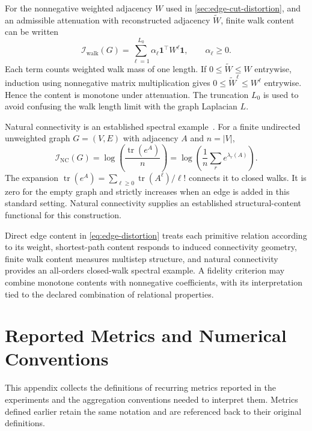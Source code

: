For the nonnegative weighted adjacency $W$ used in \cref{sec:edge-cut-distortion}, and an admissible attenuation with reconstructed adjacency $\widetilde W$, finite walk content can be written
\begin{equation}
\mathcal I_{\mathrm{walk}}(G)
=\sum_{\ell=1}^{L_0}\alpha_\ell\mathbf1^\top W^\ell\mathbf1,
\qquad\alpha_\ell\ge0.
\end{equation}
Each term counts weighted walk mass of one length.
If $0\le\widetilde W\le W$ entrywise, induction using nonnegative matrix multiplication gives $0\le\widetilde W^\ell\le W^\ell$ entrywise.
Hence the content is monotone under attenuation.
The truncation $L_0$ is used to avoid confusing the walk length limit with the graph Laplacian $L$.

Natural connectivity is an established spectral example~\citep{wu2010natural}.
For a finite undirected unweighted graph $G=(V,E)$ with adjacency $A$ and $n=|V|$,
\begin{equation}
\mathcal I_{\mathrm{NC}}(G)
=\log\left(\frac{\operatorname{tr}(e^A)}{n}\right)
=\log\left(\frac1n\sum_r e^{\lambda_r(A)}\right).
\end{equation}
The expansion $\operatorname{tr}(e^A)=\sum_{\ell\ge0}\operatorname{tr}(A^\ell)/\ell!$ connects it to closed walks.
It is zero for the empty graph and strictly increases when an edge is added in this standard setting.
Natural connectivity supplies an established structural-content functional for this construction.

Direct edge content in \cref{eq:edge-distortion} treats each primitive relation according to its weight, shortest-path content responds to induced connectivity geometry, finite walk content measures multistep structure, and natural connectivity provides an all-orders closed-walk spectral example.
A fidelity criterion may combine monotone contents with nonnegative coefficients, with its interpretation tied to the declared combination of relational properties.

\section{Reported Metrics and Numerical Conventions}
\label{app:metric-definitions}

This appendix collects the definitions of recurring metrics reported in the experiments and the aggregation conventions needed to interpret them.
Metrics defined earlier retain the same notation and are referenced back to their original definitions.


